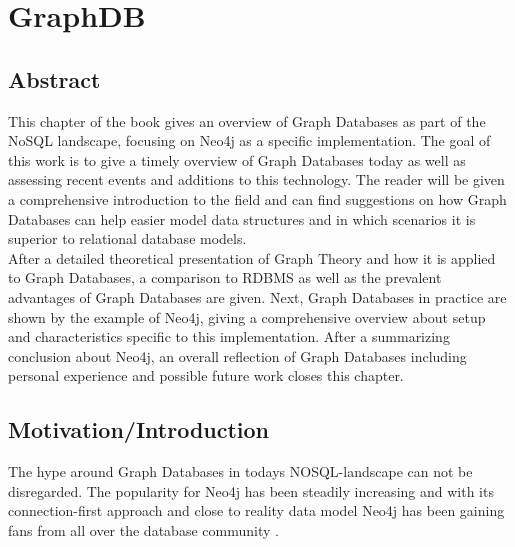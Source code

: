 
\chapter{GraphDB}
\section{Abstract}
This chapter of the book gives an overview of Graph Databases as part of the NoSQL landscape, focusing on Neo4j as a specific implementation. The goal of this work is to give a timely overview of Graph Databases today as well as assessing recent events and additions to this technology. The reader will be given a comprehensive introduction to the field and can find suggestions on how Graph Databases can help easier model data structures and in which scenarios it is superior to relational database models. \\
After a detailed theoretical presentation of Graph Theory and how it is applied to Graph Databases, a comparison to RDBMS as well as the prevalent advantages of Graph Databases are given. Next, Graph Databases in practice are shown by the example of Neo4j, giving a comprehensive overview about setup and characteristics specific to this implementation. After a summarizing conclusion about Neo4j, an overall reflection of Graph Databases including personal experience and possible future work closes this chapter.


\section{Motivation/Introduction}
The hype around Graph Databases in todays NOSQL-landscape can not be disregarded. The popularity for Neo4j has been steadily increasing and with its connection-first approach and close to reality data model Neo4j has been gaining fans from all over the database community \autocite{neo4jmark}.

